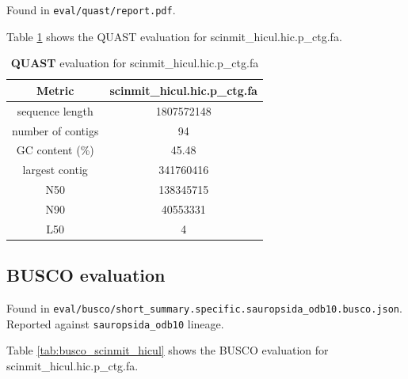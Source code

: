 \documentclass[12pt]{article}
\begin{document}
Found in \texttt{eval/quast/report.pdf}. 

Table \ref{tab:quast_scinmit_hicul} shows the QUAST evaluation for scinmit\_hicul.hic.p\_ctg.fa.

\begin{table}[h!]
    \begin{center}
    \begin{tabular}{ |c|c| }
        \hline
        Metric & scinmit\_hicul.hic.p\_ctg.fa \\
        \hline
        sequence length & 1807572148 \\
        number of contigs & 94 \\
        GC content (\%) & 45.48 \\
        largest contig & 341760416 \\
        N50 & 138345715 \\
        N90 & 40553331 \\
        L50 & 4 \\
        \hline
    \end{tabular}
    \caption{\textbf{QUAST} evaluation for scinmit\_hicul.hic.p\_ctg.fa}
    \label{tab:quast_scinmit_hicul}
    \end{center}
    \end{table}

\subsection{BUSCO evaluation}

Found in \texttt{eval/busco/short\_summary.specific.sauropsida\_odb10.busco.json}. Reported against \texttt{sauropsida\_odb10} lineage.

Table \ref{tab:busco_scinmit_hicul} shows the BUSCO evaluation for scinmit\_hicul.hic.p\_ctg.fa.
\end{document}
